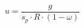 \begin{equation}
\label{FechKalecki}
u = \frac{g}{s_p\cdot R\cdot (1-\omega)}
\end{equation}

\begin{comment}
COMENTÁRIO: Esta parte estava realmente confusa. Mesmo se estivesse clara, estaria desconexa com o parágrafo seguinte

\textcite{steindl_stagnation_1979}, por sua vez, define maturidade como a inadequação da função de lucros diante da taxa de crescimento da economia em que o menor grau de utilização da capacidade em uma estrutura de mercado oligopolista (como em \textcite{kalecki_theory_1954}) acomoda essa menor taxa de investimento, explicando a estagnação. 




Nesta família de modelos, o investimento\footnote{Vale destacar que a função poupança não difere nesses modelos, mas pode ser modificada para permitir uma primeira aproximação  da distribuição pessoal da renda \cites{carvalho_personal_2016}{palley_wage-_2017}. A essência do modelo, como mencionado, está contida na função investimento \ref{InvestoKalecki}.} é determinado por:

\begin{equation}
    \label{InvestoKalecki}
    \frac{I}{K} = \gamma + \gamma_u\cdot u + \gamma_{\pi}\pi = g
\end{equation}
em que $\gamma$ é a parcela autônoma do investimento, $\gamma_u$ representa a sensibilidade do investimento à mudanças no grau de utilização e $\gamma_{\pi}$ em relação ao \textit{profit-share}\footnote{Esse último termo é destacado para evidenciar a crítica de \textcite{bhaduri_unemployment_1990} que inaugura os modelos pós-kaleckianos. Argumenta-se a inclusão deste componente não altera o mecanismo de funcionamento do modelo, mas amplia os resultados possíveis.}. Partindo da versão mais simplificada em que o investimento induzido depende apenas do grau de utilização ($\gamma_{\pi} = 0$),  a equação \ref{InvestoKalecki} pode ser tratada em termos da equação \ref{Sintetica}:

$$
\gamma + \gamma_u\cdot u = \mybox{g = g_K} = f\frac{s u}{\overline v}
$$
Tal como no modelo de Cambridge, supõe-se que o componente autônomo do investimento seja exógeno ($\gamma = \overline \gamma$) e que a propensão marginal a poupar é definida exogenamente e idêntica a propensão média ($f=1$), ou seja

$$
\gamma_u\cdot u = \frac{\overline s u}{\overline v} - \overline \gamma
$$
rearranjando:
$$
u = \left(\frac{\overline s u}{\overline v} - \overline \gamma\right)\frac{1}{\gamma_u}
$$

\begin{equation}
\label{FechKalecki}
    \therefore u =  \left(\frac{\overline \gamma\cdot v}{\overline s - \gamma_u}\right)
\end{equation}
\end{comment}

